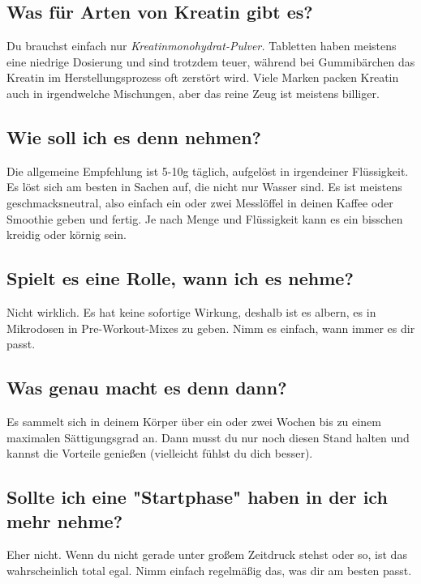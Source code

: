 \documentclass{article}
\begin{document}
{{{\subsection{Was für Arten von Kreatin gibt es?}

Du brauchst einfach nur \textit{Kreatinmonohydrat-Pulver.} Tabletten haben meistens eine niedrige Dosierung und sind trotzdem teuer, während bei Gummibärchen das Kreatin im Herstellungsprozess oft zerstört wird. Viele Marken packen Kreatin auch in irgendwelche Mischungen, aber das reine Zeug ist meistens billiger.

\subsection{Wie soll ich es denn nehmen?}

Die allgemeine Empfehlung ist 5-10g täglich, aufgelöst in irgendeiner Flüssigkeit. Es löst sich am besten in Sachen auf, die nicht nur Wasser sind. Es ist meistens geschmacksneutral, also einfach ein oder zwei Messlöffel in deinen Kaffee oder Smoothie geben und fertig. Je nach Menge und Flüssigkeit kann es ein bisschen kreidig oder körnig sein.

\subsection{Spielt es eine Rolle, wann ich es nehme?}

Nicht wirklich. Es hat keine sofortige Wirkung, deshalb ist es albern, es in Mikrodosen in Pre-Workout-Mixes zu geben. Nimm es einfach, wann immer es dir passt.

\subsection{Was genau macht es denn dann?}

Es sammelt sich in deinem Körper über ein oder zwei Wochen bis zu einem maximalen Sättigungsgrad an. Dann musst du nur noch diesen Stand halten und kannst die Vorteile genießen (vielleicht fühlst du dich besser).

\subsection{Sollte ich eine "Startphase" haben in der ich mehr nehme?}

Eher nicht. Wenn du nicht gerade unter großem Zeitdruck stehst oder so, ist das wahrscheinlich total egal. Nimm einfach regelmäßig das, was dir am besten passt.

}}}
\end{document}

